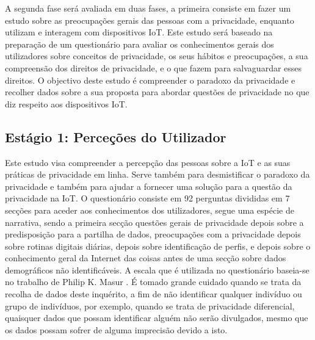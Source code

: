 \documentclass[conference]{IEEEtran}
\begin{document}
\vspace{5mm}

A segunda fase será avaliada em duas fases, a primeira consiste em fazer
um estudo sobre as preocupações gerais das pessoas com a privacidade, enquanto
utilizam e interagem com dispositivos IoT. Este estudo será baseado na preparação
de um questionário para avaliar os conhecimentos gerais dos utilizadores
sobre conceitos de privacidade, os seus hábitos e preocupações, a sua compreensão
dos direitos de privacidade, e o que fazem para salvaguardar esses direitos.
O objectivo deste estudo é compreender o paradoxo da privacidade e recolher
dados sobre a sua proposta para abordar questões de privacidade no que diz
respeito aos dispositivos IoT.


\subsection{Estágio 1: Perceções do Utilizador}

Este estudo visa compreender a percepção das pessoas sobre a IoT e as suas
práticas de privacidade em linha. Serve também para desmistificar o paradoxo
da privacidade e também para ajudar a fornecer uma solução para a questão
da privacidade na IoT. O questionário consiste em 92 perguntas divididas em
7 secções para aceder aos conhecimentos dos utilizadores, segue uma espécie
de narrativa, sendo a primeira secção questões gerais de privacidade depois
sobre a predisposição para a partilha de dados, preocupações com a privacidade
depois sobre rotinas digitais diárias, depois sobre identificação de perfis,
e depois sobre o conhecimento geral da Internet das coisas antes de uma secção
sobre dados demográficos não identificáveis. A escala que é utilizada no questionário
baseia-se no trabalho de Philip K. Masur \cite{masur2018situational}. É tomado
grande cuidado quando se trata da recolha de dados deste inquérito, a fim de
não identificar qualquer indivíduo ou grupo de indivíduos, por exemplo, quando
se trata de privacidade diferencial, quaisquer dados que possam identificar
alguém não serão divulgados, mesmo que os dados possam sofrer de alguma imprecisão
devido a isto.
\end{document}
